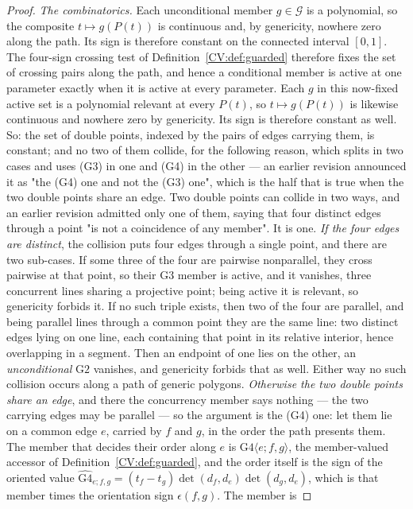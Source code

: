 \begin{proof}
\emph{The combinatorics.} Each unconditional member $g\in\mathcal G$ is a
polynomial, so the composite $t\mapsto g(P(t))$ is continuous and, by genericity,
nowhere zero along the path. Its sign is therefore constant on the connected
interval $[0,1]$. The four-sign crossing test of
Definition~\ref{CV:def:guarded} therefore fixes the set of crossing pairs
along the path, and hence a conditional member is active at one parameter
exactly when it is active at every parameter. Each $g$ in this now-fixed active
set is a polynomial relevant at every $P(t)$, so $t\mapsto g(P(t))$ is likewise
continuous and nowhere zero by genericity. Its sign is therefore constant as
well. So: the set of double points, indexed by the pairs of edges carrying them, is
constant; and no two of them collide, for the following reason, which splits in
two cases and uses (G3) in one and (G4) in the other --- an earlier revision
announced it as "the (G4) one and not the (G3) one", which is the half that is
true when the two double points share an edge. Two double points can collide in two ways, and an earlier revision admitted
only one of them, saying that four distinct edges through a point "is not a
coincidence of any member". It is one. \emph{If the four edges are distinct}, the collision puts four edges through a
single point, and there are two sub-cases. If some three of the four are
pairwise nonparallel, they cross pairwise at that point, so their
$\mathrm{G3}$ member is active, and it vanishes, three concurrent lines sharing
a projective point; being active it is relevant, so genericity forbids it. If
no such triple exists, then two of the four are parallel, and being parallel
lines through a common point they are the same line: two distinct edges lying
on one line, each containing that point in its relative interior, hence
overlapping in a segment. Then an endpoint of one lies on the other, an
\emph{unconditional} $\mathrm{G2}$ vanishes, and genericity forbids that as
well. Either way no such collision occurs along a path of generic polygons.
\emph{Otherwise the two double points share an edge}, and there the concurrency
member says nothing --- the two carrying edges may be parallel --- so the
argument is the (G4) one: let them lie on a common edge
$e$, carried by $f$ and $g$, in the order the path presents them. The member
that decides their order along $e$ is
$\mathrm{G4}\langle e;f,g\rangle$, the member-valued accessor of
Definition~\ref{CV:def:guarded}, and the order itself is the sign of the oriented
value $\widehat{\mathrm{G4}}_{e;f,g}=(t_f-t_g)\det(d_f,d_e)\det(d_g,d_e)$,
which is that member times the orientation sign $\epsilon(f,g)$. The member is

\end{proof}
